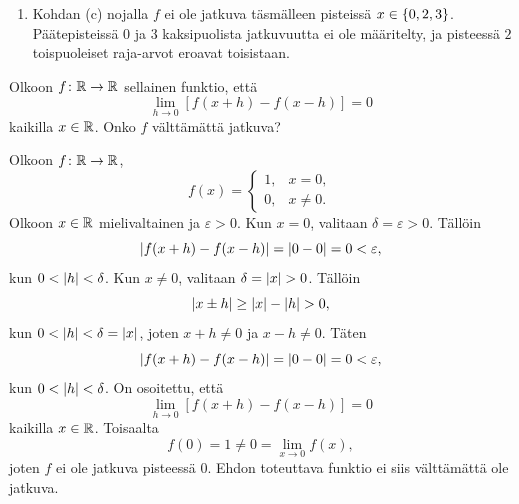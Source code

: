 \documentclass[11pt,a4paper]{amsart}
\begin{document}
\begin{solution}
\begin{enumerate}[label=(\alph*), nosep]
      nojalla \(f\) on siis jatkuva täsmälleen pisteissä
      \[
        x \in (0, 2) \cup (2, 3).
      \]
    \item Kohdan (c) nojalla \(f\) ei ole jatkuva täsmälleen pisteissä
      \(x \in \left\lbrace0, 2, 3\right\rbrace\). Päätepisteissä \(0\) ja \(3\)
      kaksipuolista jatkuvuutta ei ole määritelty, ja pisteessä \(2\)
      toispuoleiset raja-arvot eroavat toisistaan.
  \end{enumerate}
  \begin{center}
  \end{center}
\end{solution}

\begin{exercise}
  Olkoon \(f\colon \mathbb{R} \to \mathbb{R}\) sellainen funktio, että
  \[
    \lim_{h \to 0} [f(x + h) - f(x - h)] = 0
  \]
  kaikilla \(x \in \mathbb{R}\). Onko \(f\) välttämättä jatkuva?
\end{exercise}

\begin{solution}
  Olkoon \(f \colon \mathbb{R} \to \mathbb{R}\),
  \[
    f(x) =
    \begin{cases}
      1, & x = 0,\\
      0, & x \neq 0.
    \end{cases}
  \]
  Olkoon \(x \in \mathbb{R}\) mielivaltainen ja \(\varepsilon > 0\).
  Kun \(x = 0\), valitaan \(\delta = \varepsilon > 0\). Tällöin
  \[
    \lvert f(x + h) - f(x - h)\rvert = \lvert0 - 0\rvert = 0 < \varepsilon,
  \]
  kun \(0 < \lvert h\rvert < \delta\). Kun \(x \neq 0\), valitaan \(\delta =
  \lvert x\rvert > 0\). Tällöin
  \[
    \lvert x \pm h\rvert \geq \lvert x\rvert - \lvert h\rvert > 0,
  \]
  kun \(0 < \lvert h\rvert < \delta = \lvert x\rvert\), joten \(x + h \neq 0\)
  ja \(x - h \neq 0\). Täten
  \[
    \lvert f(x + h) - f(x - h)\rvert = \lvert0 - 0\rvert = 0 < \varepsilon,
  \]
  kun \(0 < \lvert h\rvert < \delta\). On osoitettu, että
  \[
    \lim_{h \to 0} [f(x + h) - f(x - h)] = 0
  \]
  kaikilla \(x \in \mathbb{R}\). Toisaalta
  \[
    f(0) = 1 \neq 0 = \lim_{x \to 0} f(x),
  \]
  joten \(f\) ei ole jatkuva pisteessä \(0\). Ehdon toteuttava funktio
  ei siis välttämättä ole jatkuva.
\end{solution}
\end{document}
